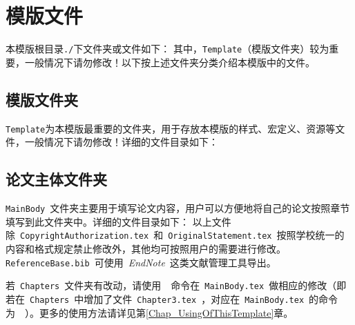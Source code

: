 \section{模版文件}
\label{Sect_Files}
本模版根目录\verb|./|下文件夹或文件如下：
其中，\verb|Template|（模版文件夹）较为重要，一般情况下请勿修改！以下按上述文件夹分类介绍本模版中的文件。

\subsection{模版文件夹}
\label{Subsect_TemplateFolder}
\verb|Template|为本模版最重要的文件夹，用于存放本模版的样式、宏定义、资源等文件，一般情况下请勿修改！详细的文件目录如下：

\subsection{论文主体文件夹}
\label{Subsect_MainbodyFolder}
\verb|MainBody|~文件夹主要用于填写论文内容，用户可以方便地将自己的论文按照章节填写到此文件夹中。详细的文件目录如下：
以上文件除~\verb|CopyrightAuthorization.tex|~和~\verb|OriginalStatement.tex|~按照学校统一的内容和格式规定禁止修改外，其他均可按照用户的需要进行修改。\\
\verb|ReferenceBase.bib|~可使用~\emph{EndNote\textsuperscript{\texttrademark}}~这类文献管理工具导出。


若~\verb|Chapters|~文件夹有改动，请使用~\verb||~命令在~\verb|MainBody.tex|~做相应的修改（即若在~\verb|Chapters|~中增加了文件~\verb|Chapter3.tex|~，对应在~\verb|MainBody.tex|~的命令为~\verb||~）。更多的使用方法请详见第\ref{Chap_UsingOfThisTemplate}章。

